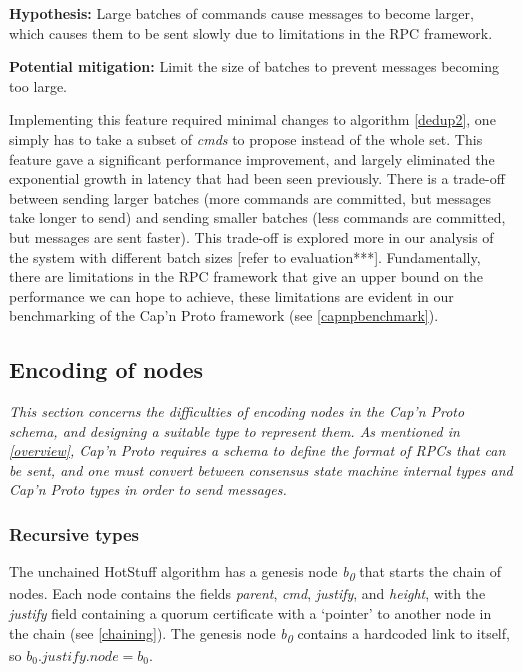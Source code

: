 \textbf{Hypothesis: } Large batches of commands cause messages to become larger, which causes them to be sent slowly due to limitations in the RPC framework.

\textbf{Potential mitigation: } Limit the size of batches to prevent messages becoming too large.

Implementing this feature required minimal changes to algorithm \ref{dedup2}, one simply has to take a subset of \textit{cmds} to propose instead of the whole set. This feature gave a significant performance improvement, and largely eliminated the exponential growth in latency that had been seen previously. There is a trade-off between sending larger batches (more commands are committed, but messages take longer to send) and sending smaller batches (less commands are committed, but messages are sent faster). This trade-off is explored more in our analysis of the system with different batch sizes [refer to evaluation***]. Fundamentally, there are limitations in the RPC framework that give an upper bound on the performance we can hope to achieve, these limitations are evident in our benchmarking of the Cap'n Proto framework (see \ref{capnpbenchmark}).
\subsection{Encoding of nodes}
\textit{This section concerns the difficulties of encoding nodes in the Cap'n Proto schema, and designing a suitable type to represent them. As mentioned in \ref{overview}, Cap'n Proto requires a schema to define the format of RPCs that can be sent, and one must convert between consensus state machine internal types and Cap'n Proto types in order to send messages.}

\subsubsection{Recursive types}
The unchained HotStuff algorithm has a genesis node \textit{b\textsubscript{0}} that starts the chain of nodes. Each node contains the fields \textit{parent}, \textit{cmd}, \textit{justify}, and \textit{height}, with the \textit{justify} field containing a quorum certificate with a `pointer' to another node in the chain (see \ref{chaining}). The genesis node \textit{b\textsubscript{0}} contains a hardcoded link to itself, so $ b_0.\textit{justify}.\textit{node} = b_0$.

